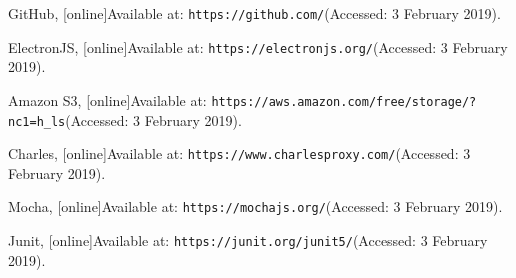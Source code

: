 \begin{thebibliography}{9}
GitHub, [online]Available at:
\texttt{https://github.com/}(Accessed: 3 February 2019).

ElectronJS, [online]Available at:
\texttt{https://electronjs.org/}(Accessed: 3 February 2019).

Amazon S3, [online]Available at:
\texttt{https://aws.amazon.com/free/storage/?nc1=h\_ls}(Accessed: 3 February 2019).

Charles, [online]Available at:
\texttt{https://www.charlesproxy.com/}(Accessed: 3 February 2019).

Mocha, [online]Available at:
\texttt{https://mochajs.org/}(Accessed: 3 February 2019).

Junit, [online]Available at:
\texttt{https://junit.org/junit5/}(Accessed: 3 February 2019).


\end{thebibliography}
